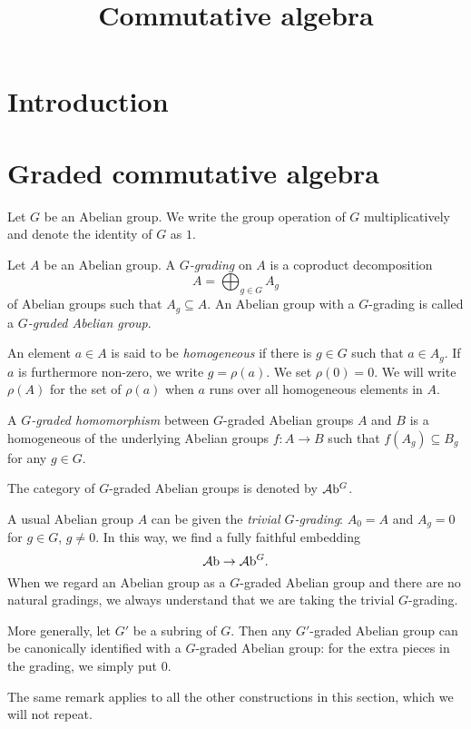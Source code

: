 
\title{Commutative algebra}

\maketitle
\tableofcontents



\section{Introduction}\label{sec-introduction}

\section{Graded commutative algebra}
Let $G$ be an Abelian group. We write the group operation of $G$ multiplicatively and denote the identity of $G$ as $1$.

\begin{definition}
    Let $A$ be an Abelian group. A \emph{$G$-grading} on $A$ is a coproduct decomposition
    \[
        A=\bigoplus_{g\in G}A_g  
    \]
    of Abelian groups such that $A_g\subseteq A$. An Abelian group with a $G$-grading is called a \emph{$G$-graded Abelian group}. 

    An element $a\in A$ is said to be \emph{homogeneous} if there is $g\in G$ such that $a\in A_g$. If $a$ is furthermore non-zero, we write $g=\rho(a)$. We set $\rho(0)=0$. We will write $\rho(A)$ for the set of $\rho(a)$ when $a$ runs over all homogeneous elements in $A$.

    A \emph{$G$-graded homomorphism} between $G$-graded Abelian groups $A$ and $B$ is a homogeneous of the underlying Abelian groups $f:A\rightarrow B$ such that $f(A_g)\subseteq B_g$ for any $g\in G$.

    The category of $G$-graded Abelian groups is denoted by $\mathcal{A}\mathrm{b}^G$.
\end{definition}
\begin{remark}
    A usual Abelian group $A$ can be given the \emph{trivial $G$-grading}: $A_0=A$ and $A_g=0$ for $g\in G$, $g\neq 0$. In this way, we find a fully faithful embedding 
    \[
        \mathcal{A}\mathrm{b}\rightarrow \mathcal{A}\mathrm{b}^G.  
    \]
    When we regard an Abelian group as a $G$-graded Abelian group and there are no natural gradings, we always understand that we are taking the trivial $G$-grading.
    
    More generally, let $G'$ be a subring of $G$. Then any $G'$-graded Abelian group can be canonically identified with a $G$-graded Abelian group: for the extra pieces in the grading, we simply put $0$.

    The same remark applies to all the other constructions in this section, which we will not repeat.
\end{remark}




